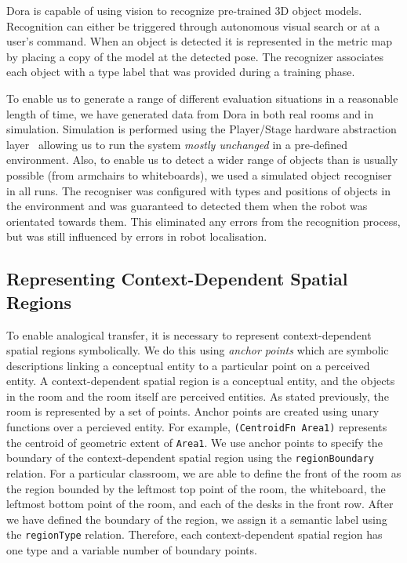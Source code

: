 \documentclass[letterpaper]{article}
\newcommand{\from}[2]{\textcolor{red}{\noindent\textbf{//}\textbf{Note
      from #1:}\textsc{ #2}\textbf{//}}}
\newcommand{\fw}[1]{\texttt{#1}}
\begin{document}
Dora is capable of using vision to recognize pre-trained 3D object models. Recognition can either be triggered through autonomous visual search or at a user's command. When an object is detected it is represented in the metric map 
by placing a copy of the model at the detected pose. The recognizer associates each object with a type label that was provided during a training phase.  

To enable us to generate a range of different evaluation situations in a reasonable length of time, we have generated data from Dora in both real rooms and in simulation. Simulation is performed using the Player/Stage hardware abstraction layer~\cite{GerkeyVaughanHoward03} allowing us to run the system \emph{mostly unchanged} in a pre-defined environment. Also, to enable us to detect a wider range of objects than is usually possible (from armchairs to whiteboards), we used a simulated object recogniser in all runs. The recogniser was configured with types and positions of objects in the environment and was guaranteed to detected them when the robot was orientated towards them. This eliminated any errors from the recognition process, but was still influenced by errors in robot localisation. 




\subsection{Representing Context-Dependent Spatial Regions}

To enable analogical transfer, it is necessary to represent context-dependent spatial regions symbolically. We do this using \textit{anchor points} \cite{Klenk/etal2005} which are symbolic descriptions linking a conceptual entity to a particular point on a perceived entity.  A context-dependent spatial region is a conceptual entity, and the objects in the room and the room itself are perceived entities. As stated previously, the room is represented by a set of points. Anchor points are created using unary functions over a percieved entity. For example, \fw{(CentroidFn Area1)} represents the centroid of geometric extent of \fw{Area1}. We use anchor points to specify the boundary of the context-dependent spatial region using the \fw{regionBoundary} relation. For a particular classroom, we are able to define the front of the room as the region bounded by the leftmost top point of the room, the whiteboard, the leftmost bottom point of the room, and each of the desks in the front row. After we have defined the boundary of the region, we assign it a semantic label using the \fw{regionType} relation. Therefore, each context-dependent spatial region has one type and a variable number of boundary points.
\end{document}
